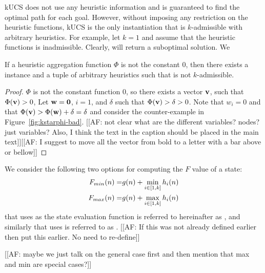 \ac{kUCS} does not use any heuristic information and is guaranteed to find the optimal path for each goal. However, without imposing any restriction on the heuristic functions, \ac{kUCS} is the only \kastar instantiation that is $k$-admissible with arbitrary heuristics. 
For example, let $k=1$ and assume that the heuristic functions is inadmissible. Clearly, \kastar will return a suboptimal solution. We 

\begin{theorem}
  \label{thm:arbitrary-dual}
  If a heuristic aggregation function $\Phi$ is not the constant 0, then there exists a \kgs instance and a tuple of arbitrary heuristics such that \kastarphi is not $k$-admissible.
\end{theorem}
\begin{proof}
  $\Phi$ is not the constant function 0, so there exists a vector $\mathbf{v}$, such that $\Phi(\mathbf{v}) > 0$,
  Let $\mathbf{w} = \mathbf{0}$, $i = 1$, and $\delta$ such that $\Phi(\mathbf{v}) > \delta > 0$.
  Note that $w_i = 0$ and that $\Phi(\mathbf{v}) > \Phi(\mathbf{w}) + \delta = \delta$ and consider the counter-example in Figure~\ref{fig:kstarphi-bad}. [[AF: not clear what are the different variables? nodes? just variables? Also, I think the text in the caption should be placed in the main text]][[AF: I suggest to move all the vector from bold to a letter with a bar above or bellow]]
\end{proof}





We consider the following two options for computing the $F$ value of a state:  
\begin{align}
  \text{$F_{min}(n)$} =& g(n) + \min_{i\in [1,k]}h_i(n) \\
  \text{$F_{max}(n)$} =& g(n) + \max_{i\in [1,k]}h_i(n)
\end{align}
\kastar that uses \minf as the state evaluation function is referred to hereinafter as \kastarmin, and similarly \kastar that uses \maxf is referred to as \kastarmax. [[AF: If this was not already defined earlier then put this earlier. No need to re-define]]






[[AF: maybe we just talk on the general case first and then mention that max and min are special cases?]]

